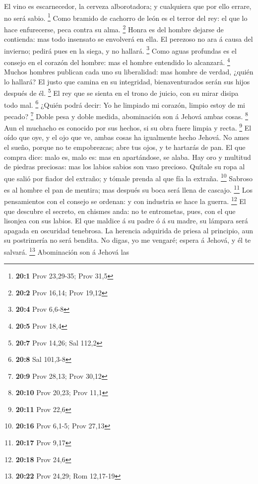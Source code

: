  El vino es escarnecedor, la cerveza alborotadora; y
cualquiera que por ello errare, no será sabio. \footnote{\textbf{20:1}
  Prov 23,29-35; Prov 31,5}  Como bramido de cachorro de
león es el terror del rey: el que lo hace enfurecerse, peca contra su
alma. \footnote{\textbf{20:2} Prov 16,14; Prov 19,12}  Honra
es del hombre dejarse de contienda: mas todo insensato se envolverá en
ella.  El perezoso no ara á causa del invierno; pedirá pues
en la siega, y no hallará. \footnote{\textbf{20:4} Prov 6,6-8}
 Como aguas profundas es el consejo en el corazón del
hombre: mas el hombre entendido lo alcanzará. \footnote{\textbf{20:5}
  Prov 18,4}  Muchos hombres publican cada uno su
liberalidad: mas hombre de verdad, ¿quién lo hallará?  El
justo que camina en su integridad, bienaventurados serán sus hijos
después de él. \footnote{\textbf{20:7} Prov 14,26; Sal 112,2}
 El rey que se sienta en el trono de juicio, con su mirar
disipa todo mal. \footnote{\textbf{20:8} Sal 101,3-8} 
¿Quién podrá decir: Yo he limpiado mi corazón, limpio estoy de mi
pecado? \footnote{\textbf{20:9} Prov 28,13; Prov 30,12} 
Doble pesa y doble medida, abominación son á Jehová ambas cosas.
\footnote{\textbf{20:10} Prov 20,23; Prov 11,1}  Aun el
muchacho es conocido por sus hechos, si su obra fuere limpia y recta.
\footnote{\textbf{20:11} Prov 22,6}  El oído que oye, y el
ojo que ve, ambas cosas ha igualmente hecho Jehová.  No
ames el sueño, porque no te empobrezcas; abre tus ojos, y te hartarás de
pan.  El que compra dice: malo es, malo es: mas en
apartándose, se alaba.  Hay oro y multitud de piedras
preciosas: mas los labios sabios son vaso precioso. 
Quítale su ropa al que salió por fiador del extraño; y tómale prenda al
que fía la extraña. \footnote{\textbf{20:16} Prov 6,1-5; Prov 27,13}
 Sabroso es al hombre el pan de mentira; mas después su
boca será llena de cascajo. \footnote{\textbf{20:17} Prov 9,17}
 Los pensamientos con el consejo se ordenan: y con
industria se hace la guerra. \footnote{\textbf{20:18} Prov 24,6}
 El que descubre el secreto, en chismes anda: no te
entrometas, pues, con el que lisonjea con sus labios.  El
que maldice á su padre ó á su madre, su lámpara será apagada en
oscuridad tenebrosa.  La herencia adquirida de priesa al
principio, aun su postrimería no será bendita.  No digas,
yo me vengaré; espera á Jehová, y él te salvará. \footnote{\textbf{20:22}
  Prov 24,29; Rom 12,17-19}  Abominación son á Jehová las
